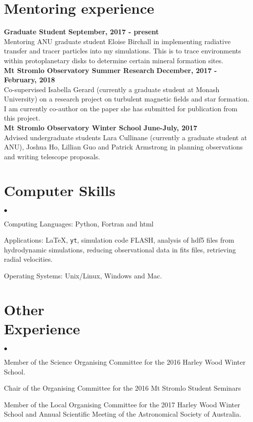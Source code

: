 \documentclass[margin,line]{res}
\newenvironment{list2}{
	\begin{list}{$\bullet$}{%
			\setlength{\itemsep}{0in}
			\setlength{\parsep}{0in} \setlength{\parskip}{0in}
			\setlength{\topsep}{0in} \setlength{\partopsep}{0in} 
			\setlength{\leftmargin}{0.2in}}}{\end{list}}
\begin{document}
\begin{resume}
		\section{\sc Mentoring experience}
		{\bf Graduate Student} \hfill {\bf September, 2017 - present}\\
		Mentoring ANU graduate student Eloise Birchall in implementing radiative transfer and tracer particles into my simulations. This is to trace environments within protoplanetary disks to determine certain mineral formation sites.\\
		{\bf Mt Stromlo Observatory Summer Research} \hfill {\bf December, 2017 - February, 2018}\\
		Co-supervised Isabella Gerard (currently a graduate student at Monash University) on a research project on turbulent magnetic fields and star formation. I am currently co-author on the paper she has submitted for publication from this project.\\
		{\bf Mt Stromlo Observatory Winter School} \hfill {\bf June-July, 2017}\\
		Advised undergraduate students Lara Cullinane (currently a graduate student at ANU), Joshua Ho, Lillian Guo and Patrick Armstrong in planning observations and writing telescope proposals.
		
		\section{\sc Computer Skills} 
		\begin{list2}
			\item Computing Languages: Python, Fortran and html
			\item Applications: \LaTeX , \texttt{yt}, simulation code FLASH, analysis of hdf5 files from hydrodynamic simulations, reducing observational data in fits files, retrieving radial velocities.  
			\item Operating Systems:  Unix/Linux, Windows and Mac.
		\end{list2}
		
		\section{\sc Other \\ Experience}
		\begin{list2}
			\item Member of the Science Organising Committee for the 2016 Harley Wood Winter School.
			\item Chair of the Organising Committee for the 2016 Mt Stromlo Student Seminars
			\item Member of the Local Organising Committee for the 2017 Harley Wood Winter School and Annual Scientific Meeting of the Astronomical Society of Australia.
		\end{list2}
		

\end{resume}
\end{document}
